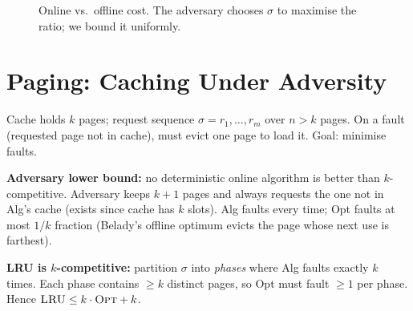 \begin{figure}[h]\centering
{}
\caption{Online vs.\ offline cost. The adversary chooses $\sigma$ to maximise the ratio; we bound it uniformly.}
\label{fig:competitive}
\end{figure}

\section{Paging: Caching Under Adversity}
\label{sec:paging}

Cache holds $k$ pages; request sequence $\sigma=r_1,\dots,r_m$ over $n>k$ pages. On a fault (requested page not in cache), must evict one page to load it. Goal: minimise faults.

\textbf{Adversary lower bound:} no deterministic online algorithm is better than $k$-competitive. Adversary keeps $k+1$ pages and always requests the one not in Alg's cache (exists since cache has $k$ slots). Alg faults every time; Opt faults at most $1/k$ fraction (Belady's offline optimum evicts the page whose next use is farthest).

\textbf{LRU is $k$-competitive:} partition $\sigma$ into \emph{phases} where Alg faults exactly $k$ times. Each phase contains $\ge k$ distinct pages, so Opt must fault $\ge1$ per phase. Hence $\textsc{LRU}\le k\cdot\textsc{Opt}+k$.

